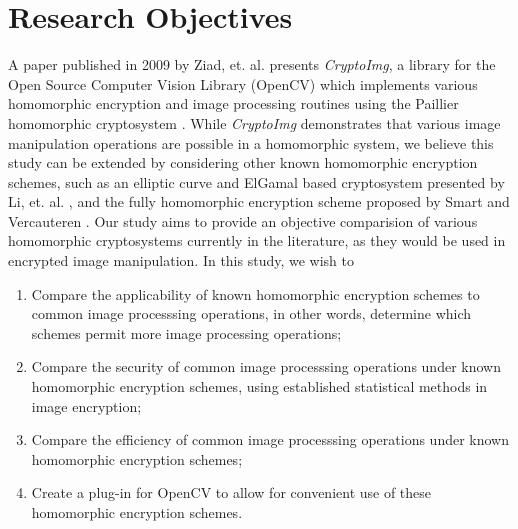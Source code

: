 \section{Research Objectives}

A paper published in 2009 by Ziad, et. al. presents \textit{CryptoImg}, a library for the  Open Source Computer Vision Library (OpenCV) which implements various homomorphic encryption and image processing routines using the Paillier homomorphic cryptosystem \cite{ziad_cryptoimg:_2016}. While \textit{CryptoImg} demonstrates that various image manipulation operations are possible in a homomorphic system, we believe this study can be extended by considering other known homomorphic encryption schemes, such as an elliptic curve and ElGamal based cryptosystem presented by Li, et. al. \cite{li_elliptic_2012}, and the fully homomorphic encryption scheme proposed by Smart and Vercauteren \cite{hutchison_fully_2010}. Our study aims to provide an objective comparision of various homomorphic cryptosystems currently in the literature, as they would be used in encrypted image manipulation.
In this study, we wish to
\begin{enumerate}
    \item Compare the applicability of known homomorphic encryption schemes to common image processsing operations, in other words, determine which schemes permit more image processing operations;
		\item Compare the security of common image processsing operations under known homomorphic encryption schemes, using established statistical methods in image encryption;
    \item Compare the efficiency of common image processsing operations under known homomorphic encryption schemes;
    \item Create a plug-in for OpenCV to allow for convenient use of these homomorphic encryption schemes.
\end{enumerate}
